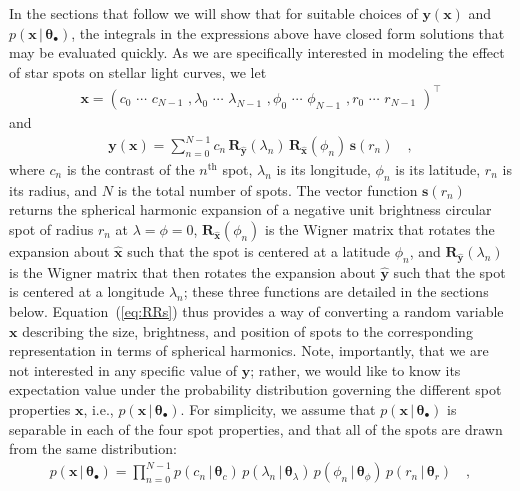 \documentclass[modern]{aastex62}
\begin{document}
In the sections that follow we will show that for suitable choices of $\mathbf{y}(\mathbf{x})$
and $p(\mathbf{x} \, \big| \, \pmb{\theta}_\bullet)$, the integrals in the expressions
above have closed form solutions that may be evaluated quickly.
%
As we are specifically interested in modeling the effect of star spots
on stellar light curves, we let
%
\begin{align}
    \mathbf{x} =
    \left(
    c_0 \,\, \cdots \,\, c_{N-1} \,\,
    ,
    \lambda_0 \,\, \cdots \,\, \lambda_{N-1} \,\,
    ,
    \phi_0 \,\, \cdots \,\, \phi_{N-1} \,\,
    ,
    r_0 \,\, \cdots \,\, r_{N-1} \,\,
    \right)^\top
\end{align}
%
and
%
\begin{align}
    \label{eq:RRs}
    \mathbf{y}(\mathbf{x}) =
    \sum_{n=0}^{N-1}
    c_n
    \,
    \mathbf{R}_{\hat{\mathbf{y}}}(\lambda_n)
    \,
    \mathbf{R}_{\hat{\mathbf{x}}}(\phi_n)
    \,
    \mathbf{s}(r_n)
    \quad,
\end{align}
%
where $c_n$ is the contrast of the $n^\mathrm{th}$ spot,
$\lambda_n$ is its longitude, $\phi_n$ is its latitude,
$r_n$ is its radius, and $N$ is the total number of spots.
The vector function $\mathbf{s}(r_n)$
returns the spherical harmonic expansion of a negative unit brightness
circular spot of radius $r_n$ at $\lambda = \phi = 0$,
$\mathbf{R}_{\hat{\mathbf{x}}}(\phi_n)$ is the Wigner matrix that rotates the
expansion about $\hat{\mathbf{x}}$ such that the spot is centered at a
latitude $\phi_n$, and $\mathbf{R}_{\hat{\mathbf{y}}}(\lambda_n)$ is the Wigner
matrix that then rotates the
expansion about $\hat{\mathbf{y}}$ such that the spot is centered at a
longitude $\lambda_n$; these three functions are detailed in the sections below.
%
Equation~(\ref{eq:RRs}) thus provides a way of converting a random variable
$\mathbf{x}$ describing the size, brightness, and position of spots to the
corresponding representation in terms of spherical harmonics.
%
Note, importantly, that we are not interested in any specific value of
$\mathbf{y}$; rather, we would like to know its expectation value under
the probability distribution governing the different spot properties $\mathbf{x}$,
i.e., $p(\mathbf{x} \, \big| \, \pmb{\theta}_\bullet)$.
%
For simplicity, we assume that $p(\mathbf{x} \, \big| \, \pmb{\theta}_\bullet)$
is separable in each of the four spot properties, and that all of the spots
are drawn from the same distribution:
%
\begin{align}
    p(\mathbf{x} \, \big| \, \pmb{\theta}_\bullet)
    =
    \prod_{n=0}^{N-1}
    p(c_n \, \big| \, \pmb{\theta}_{c}) \,
    p(\lambda_n \, \big| \, \pmb{\theta}_{\lambda}) \,
    p(\phi_n \, \big| \, \pmb{\theta}_{\phi})\,
    p(r_n \, \big| \, \pmb{\theta}_{r})
    \quad,
\end{align}
\end{document}
